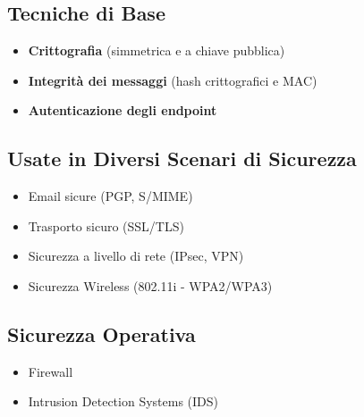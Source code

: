 \subsection{Tecniche di Base}
\begin{itemize}
    \item \textbf{Crittografia} (simmetrica e a chiave pubblica)
    \item \textbf{Integrità dei messaggi} (hash crittografici e MAC)
    \item \textbf{Autenticazione degli endpoint}
\end{itemize}

\subsection{Usate in Diversi Scenari di Sicurezza}
\begin{itemize}
    \item Email sicure (PGP, S/MIME)
    \item Trasporto sicuro (SSL/TLS)
    \item Sicurezza a livello di rete (IPsec, VPN)
    \item Sicurezza Wireless (802.11i - WPA2/WPA3)
\end{itemize}

\subsection{Sicurezza Operativa}
\begin{itemize}
    \item Firewall
    \item Intrusion Detection Systems (IDS)
\end{itemize}

